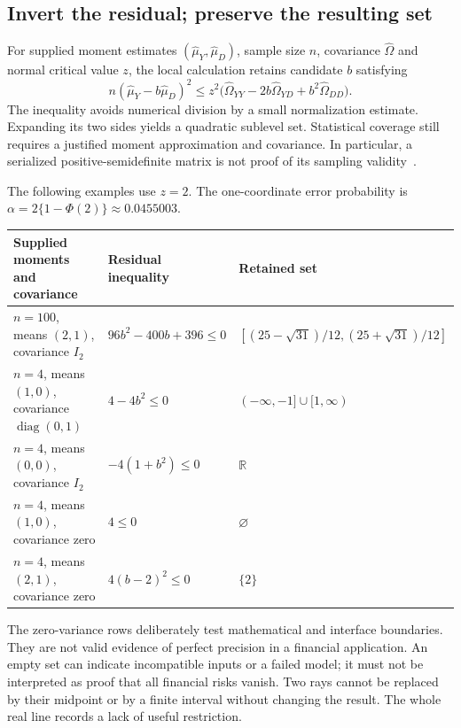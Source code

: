 \subsection{Invert the residual; preserve the resulting set}

For supplied moment estimates $(\widehat\mu_Y,\widehat\mu_D)$, sample
size $n$, covariance $\widehat\Omega$ and normal critical value $z$,
the local calculation retains candidate $b$ satisfying
\begin{equation}
 n(\widehat\mu_Y-b\widehat\mu_D)^2
 \le z^2\bigl(
   \widehat\Omega_{YY}-2b\widehat\Omega_{YD}
      +b^2\widehat\Omega_{DD}\bigr).
 \label{exec13:funding-inversion}
\end{equation}
The inequality avoids numerical division by a small normalization estimate.
Expanding its two sides yields a quadratic sublevel set. Statistical coverage
still requires a justified moment approximation and covariance. In
particular, a serialized positive-semidefinite matrix is not proof of its
sampling validity~\citep{exec13_funding_service}.

The following examples use $z=2$. The one-coordinate error probability is
$\alpha=2\{1-\Phi(2)\}\approx0.0455003$.
\begin{center}
\small
\begin{tabular}{p{.31\linewidth}p{.28\linewidth}p{.29\linewidth}}
\toprule
Supplied moments and covariance & Residual inequality & Retained set\\
\midrule
$n=100$, means $(2,1)$, covariance $I_2$
& $96b^2-400b+396\le0$
& $[(25-\sqrt{31})/12,(25+\sqrt{31})/12]$\\[5pt]
$n=4$, means $(1,0)$, covariance $\operatorname{diag}(0,1)$
& $4-4b^2\le0$
& $(-\infty,-1]\cup[1,\infty)$\\[5pt]
$n=4$, means $(0,0)$, covariance $I_2$
& $-4(1+b^2)\le0$
& $\mathbb R$\\[5pt]
$n=4$, means $(1,0)$, covariance zero
& $4\le0$
& $\varnothing$\\[5pt]
$n=4$, means $(2,1)$, covariance zero
& $4(b-2)^2\le0$
& $\{2\}$\\
\bottomrule
\end{tabular}
\end{center}
The zero-variance rows deliberately test mathematical and interface
boundaries. They are not valid evidence of perfect precision in a financial
application. An empty set can indicate incompatible inputs or a failed
model; it must not be interpreted as proof that all financial risks vanish.
Two rays cannot be replaced by their midpoint or by a finite interval without
changing the result. The whole real line records a lack of useful restriction.

